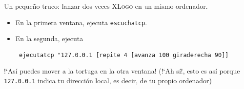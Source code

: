 \noindent Un peque\~no truco: lanzar dos veces \textsc{XLogo} en un mismo
ordenador.
\begin{itemize}
   \item En la primera ventana, ejecuta \texttt{escuchatcp}.
   \item En la segunda, ejecuta
      \begin{verbatim}
 ejecutatcp "127.0.0.1 [repite 4 [avanza 100 giraderecha 90]] \end{verbatim}
\end{itemize}
!`As\'i puedes mover a la tortuga en la otra ventana! (!`Ah s\'i!, esto es
as\'i porque \texttt{127.0.0.1} indica tu direcci\'on local, es decir, de
tu propio ordenador)
